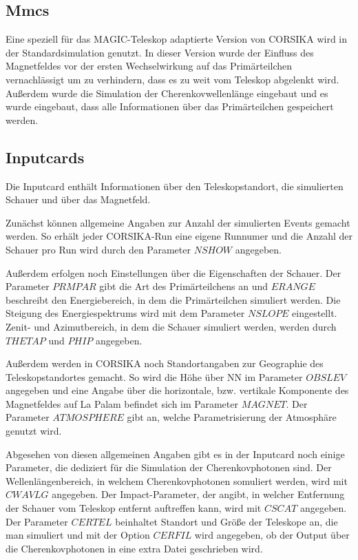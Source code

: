 \subsection{Mmcs}
Eine speziell für das MAGIC-Teleskop adaptierte Version von CORSIKA wird in der Standardsimulation genutzt.
In dieser Version wurde der Einfluss des Magnetfeldes vor der ersten Wechselwirkung auf das Primärteilchen vernachlässigt um zu verhindern, dass es zu weit vom Teleskop abgelenkt wird.
Außerdem wurde die Simulation der Cherenkovwellenlänge eingebaut und es wurde eingebaut, dass alle Informationen über das Primärteilchen gespeichert werden.

\subsection{Inputcards}
Die Inputcard enthält Informationen über den Teleskopstandort, die simulierten Schauer und über das Magnetfeld.

Zunächst können allgemeine Angaben zur Anzahl der simulierten Events gemacht werden. 
So erhält jeder CORSIKA-Run eine eigene Runnumer und die Anzahl der Schauer pro Run wird durch den Parameter $NSHOW$ angegeben.

Außerdem erfolgen noch Einstellungen über die Eigenschaften der Schauer.
Der Parameter $PRMPAR$ gibt die Art des Primärteilchens an und $ERANGE$ beschreibt den Energiebereich, in dem die Primärteilchen simuliert werden.
Die Steigung des Energiespektrums wird mit dem Parameter $NSLOPE$ eingestellt.
Zenit- und Azimutbereich, in dem die Schauer simuliert werden, werden durch $THETAP$ und $PHIP$ angegeben.

Außerdem werden in CORSIKA noch Standortangaben zur Geographie des Teleskopstandortes gemacht.
So wird die Höhe über NN im Parameter $OBSLEV$ angegeben und eine Angabe über die horizontale, bzw. vertikale Komponente des Magnetfeldes auf La Palam befindet sich im Parameter $MAGNET$.
Der Parameter $ATMOSPHERE$ gibt an, welche Parametrisierung der Atmosphäre genutzt wird.

Abgesehen von diesen allgemeinen Angaben gibt es in der Inputcard noch einige Parameter, die dediziert für die Simulation der Cherenkovphotonen sind.
Der Wellenlängenbereich, in welchem Cherenkovphotonen somuliert werden, wird mit $CWAVLG$ angegeben.
Der Impact-Parameter, der angibt, in welcher Entfernung der Schauer vom Teleskop entfernt auftreffen kann, wird mit $CSCAT$ angegeben.
Der Parameter $CERTEL$ beinhaltet Standort und Größe der Teleskope an, die man simuliert und mit der Option $CERFIL$ wird angegeben, ob der Output über die Cherenkovphotonen in eine extra Datei geschrieben wird.


